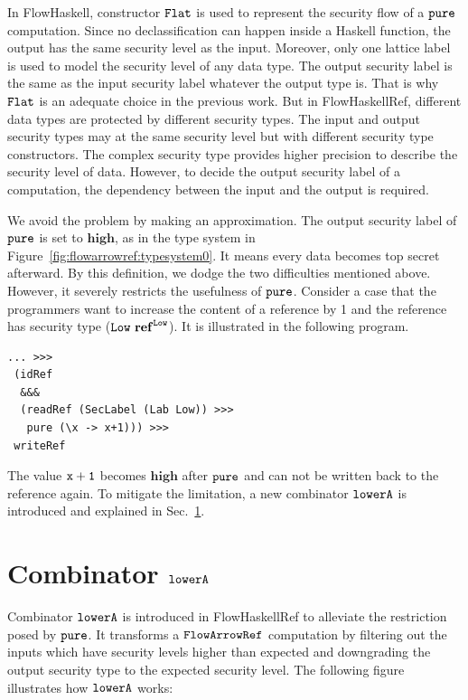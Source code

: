 \documentclass{report}
\newcommand{\co}[1]{$\cod{#1}$}
\begin{document}
In FlowHaskell, constructor \co{Flat} is used to represent the security flow of a \co{pure} computation. Since no 
declassification can happen inside a Haskell function, the output has the same security level
as the input. Moreover, only one lattice label is used to model the security level of any
data type. The output security label is the same as the input security label whatever the output type is.
That is why \co{Flat} is an adequate choice in the previous work. 
But in FlowHaskellRef, different data types are protected by different security types. The input and output
security types may at the same security level but with different security type constructors. 
The complex security type provides higher precision to describe the security level of data.
However, to decide the output security label of a computation, the dependency between the input and 
the output is required.

We avoid the problem by making an approximation.
The output security label of \co{pure} is set to $\mathbf{high}$, as in the type system in 
Figure~\ref{fig:flowarrowref:typesystem0}.
It means every data becomes top secret afterward. 
By this definition, we dodge the two difficulties mentioned above. 
However, it severely restricts the usefulness of \co{pure}. 
Consider a case that the programmers want to increase the content of a reference by 1 and the reference
has security type ($\mathtt{Low}~\mathbf{ref}^{\mathtt{Low}}$). It is illustrated in the following program.
\begin{Verbatim}[fontsize=\small]
 ... >>>
 (idRef 
  &&& 
  (readRef (SecLabel (Lab Low)) >>>
   pure (\x -> x+1))) >>>
 writeRef
\end{Verbatim}
The value \co{x+1} becomes $\mathbf{high}$ after \co{pure} and can not be written back to the reference
again. To mitigate the limitation, a new combinator \co{lowerA} is introduced and explained in
Sec.~\ref{chap4:lower}.

\section{Combinator \co{lowerA}}
\label{chap4:lower}


Combinator \co{lowerA} is introduced in FlowHaskellRef to alleviate the restriction posed by \co{pure}. 
It transforms a \co{FlowArrowRef} computation by filtering out the inputs which have security levels higher
than expected and downgrading the output security type to the expected security level.
The following figure illustrates how \co{lowerA} works:
\end{document}
